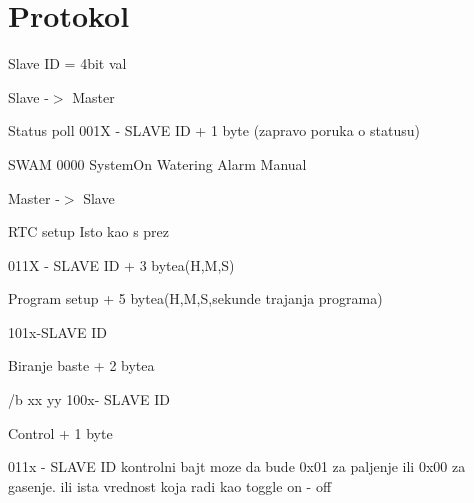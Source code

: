 \chapter{Protokol }
\hypertarget{md_docs}{}\label{md_docs}
\label{md_docs_autotoc_md0}%
%


Slave ID = 4bit val

Slave -\/\texorpdfstring{$>$}{>} Master


\begin{DoxyEnumerate}
\item Status poll 001X -\/ SLAVE ID + 1 byte (zapravo poruka o statusu)
\end{DoxyEnumerate}

SWAM 0000 System\+On Watering Alarm Manual

Master -\/\texorpdfstring{$>$}{>} Slave
\begin{DoxyEnumerate}
\item RTC setup Isto kao s prez
\end{DoxyEnumerate}

011X -\/ SLAVE ID + 3 bytea(\+H,\+M,\+S)


\begin{DoxyEnumerate}
\item Program setup + 5 bytea(\+H,\+M,\+S,sekunde trajanja programa)
\end{DoxyEnumerate}

101x-\/\+SLAVE ID


\begin{DoxyEnumerate}
\item Biranje baste + 2 bytea
\end{DoxyEnumerate}

/\+b xx yy 100x-\/ SLAVE ID


\begin{DoxyEnumerate}
\item Control + 1 byte
\end{DoxyEnumerate}

011x -\/ SLAVE ID kontrolni bajt moze da bude 0x01 za paljenje ili 0x00 za gasenje. ili ista vrednost koja radi kao toggle on -\/ off 